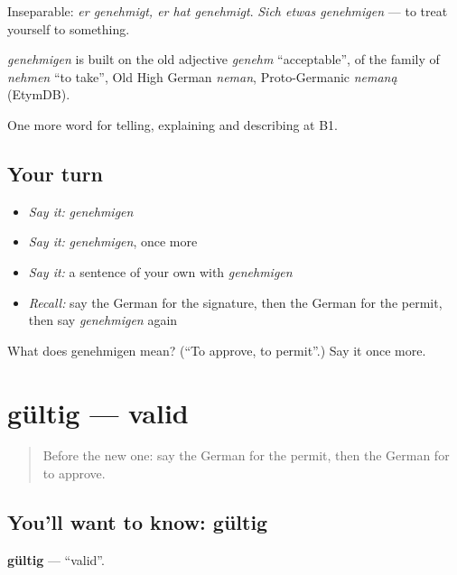 Inseparable: \emph{er genehmigt, er hat genehmigt}. \emph{Sich etwas genehmigen} — to treat yourself to something.

\begin{cousinweb}
\emph{genehmigen} is built on the old adjective \emph{genehm} \textquotedblleft{}acceptable\textquotedblright{}, of the family of \emph{nehmen} \textquotedblleft{}to take\textquotedblright{}, Old High German \emph{neman}, Proto-Germanic \emph{nemaną} (EtymDB).
\end{cousinweb}

\begin{grammarlens}[title={What you've built}]
One more word for telling, explaining and describing at B1.
\end{grammarlens}

\subsection*{Your turn}
\begin{itemize}
\raggedright
  \item \emph{Say it:} \emph{genehmigen}
  \item \emph{Say it:} \emph{genehmigen}, once more
  \item \emph{Say it:} a sentence of your own with \emph{genehmigen}
  \item \emph{Recall:} say the German for the signature, then the German for the permit, then say \emph{genehmigen} again
\end{itemize}

\begin{tcolorbox}[breakable,colback=teal!4,colframe=teal!35!black,title={Before you move on}]
What does genehmigen mean? (\textquotedblleft{}To approve, to permit\textquotedblright{}.) Say it once more.
\end{tcolorbox}
\section[gültig]{gültig — valid}

\label{lesson:GE-C384-gueltig}



\begin{quote}
Before the new one: say the German for the permit, then the German for to approve.
\end{quote}

\subsection*{You'll want to know: gültig}
\textbf{gültig} — \textquotedblleft{}valid\textquotedblright{}.

